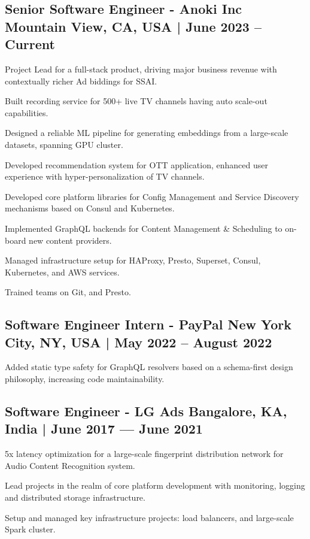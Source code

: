 \subsection{{Senior Software Engineer - Anoki Inc \hfill  Mountain View, CA, USA  | June 2023 -- Current}}
\begin{zitemize}
\item Project Lead for a full-stack product, driving major business revenue with contextually richer Ad biddings for SSAI.
\item Built recording service for 500+ live TV channels having auto scale-out capabilities.
\item Designed a reliable ML pipeline for generating embeddings from a large-scale datasets, spanning GPU cluster. 
\item Developed recommendation system for OTT application, enhanced user experience with hyper-personalization of TV channels.
\item Developed core platform libraries for Config Management and Service Discovery mechanisms based on Consul and Kubernetes.
\item Implemented GraphQL backends for Content Management \& Scheduling to on-board new content providers.
\item Managed infrastructure setup for HAProxy, Presto, Superset, Consul, Kubernetes, and AWS services.
\item Trained teams on Git, and Presto.
\end{zitemize}

\subsection{{Software Engineer Intern - PayPal \hfill New York City, NY, USA | May 2022 -- August 2022}}
\begin{zitemize}
\item Added static type safety for GraphQL resolvers based on a schema-first design philosophy, increasing code maintainability.
\end{zitemize}

\subsection{{Software Engineer - LG Ads \hfill Bangalore, KA, India | June 2017 --- June 2021}}
\begin{zitemize}
\item 5x latency optimization for a large-scale fingerprint distribution network for Audio Content Recognition system.
\item Lead projects in the realm of core platform development with monitoring, logging and distributed storage infrastructure. 
\item Setup and managed key infrastructure projects: load balancers, and large-scale Spark cluster.
\end{zitemize}

